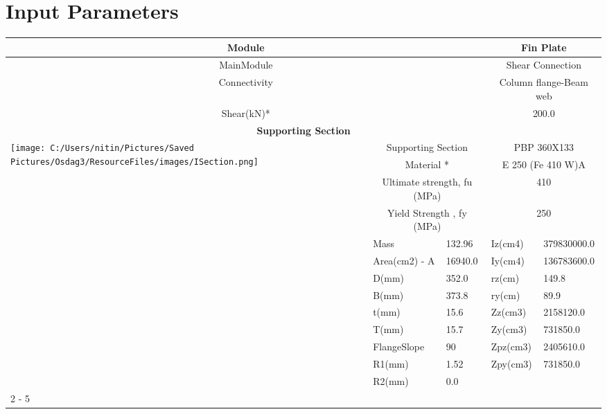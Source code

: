 \documentclass{article}%
\begin{document}
%
\normalsize%
\pagestyle{header}%
\section{Input Parameters}%
\label{sec:InputParameters}%
\renewcommand{\arraystretch}{1.2}%
\begin{longtable}{|p{5cm}|p{2cm}|p{2cm}|p{2cm}|p{5cm}|}%
\hline%
\hline%
\multicolumn{3}{|c|}{Module}&\multicolumn{2}{|c|}{Fin Plate}\\%
\hline%
\hline%
\multicolumn{3}{|c|}{MainModule}&\multicolumn{2}{|c|}{Shear Connection}\\%
\hline%
\hline%
\multicolumn{3}{|c|}{Connectivity}&\multicolumn{2}{|c|}{Column flange{-}Beam web}\\%
\hline%
\hline%
\multicolumn{3}{|c|}{Shear(kN)*}&\multicolumn{2}{|c|}{200.0}\\%
\hline%
\hline%
\multicolumn{5}{|c|}{\textbf{Supporting Section}}\\%
\hline%
\hline%
\multirow{13}{*}{\texttt{[image: C:/Users/nitin/Pictures/Saved Pictures/Osdag3/ResourceFiles/images/ISection.png]}}&\multicolumn{2}{|c|}{Supporting Section}&\multicolumn{2}{|c|}{PBP 360X133}\\%
\cline{2%
-%
5}%
&\multicolumn{2}{|c|}{Material *}&\multicolumn{2}{|c|}{E 250 (Fe 410 W)A}\\%
\cline{2%
-%
5}%
&\multicolumn{2}{|c|}{Ultimate strength, fu (MPa)}&\multicolumn{2}{|c|}{410}\\%
\cline{2%
-%
5}%
&\multicolumn{2}{|c|}{Yield Strength , fy (MPa)}&\multicolumn{2}{|c|}{250}\\%
\cline{2%
-%
5}%
&Mass&132.96&Iz(cm4)&379830000.0\\%
\cline{2%
-%
5}%
&Area(cm2) {-} A&16940.0&Iy(cm4)&136783600.0\\%
\cline{2%
-%
5}%
&D(mm)&352.0&rz(cm)&149.8\\%
\cline{2%
-%
5}%
&B(mm)&373.8&ry(cm)&89.9\\%
\cline{2%
-%
5}%
&t(mm)&15.6&Zz(cm3)&2158120.0\\%
\cline{2%
-%
5}%
&T(mm)&15.7&Zy(cm3)&731850.0\\%
\cline{2%
-%
5}%
&FlangeSlope&90&Zpz(cm3)&2405610.0\\%
\cline{2%
-%
5}%
&R1(mm)&1.52&Zpy(cm3)&731850.0\\%
\cline{2%
-%
5}%
&R2(mm)&0.0&&\\%
\cline{2%
-%
5}%
\hline%
\multicolumn{5}{|c|}{\textbf{Supported Section}}\\%

\end{longtable}
\end{document}
